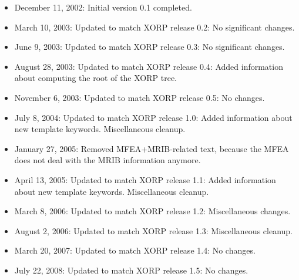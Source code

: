 \documentclass[11pt]{article}
\begin{document}
\begin{itemize}

  \item December 11, 2002: Initial version 0.1 completed.

  \item March 10, 2003: Updated to match XORP release 0.2:
   No significant changes.

  \item June 9, 2003: Updated to match XORP release 0.3:
   No significant changes.

  \item August 28, 2003: Updated to match XORP release 0.4:
   Added information about computing the root of the XORP tree.

  \item November 6, 2003: Updated to match XORP release 0.5:
   No changes.

  \item July 8, 2004: Updated to match XORP release 1.0:
   Added information about new template keywords. Miscellaneous cleanup.

  \item January 27, 2005: Removed MFEA+MRIB-related text, because the MFEA
   does not deal with the MRIB information anymore.

  \item April 13, 2005: Updated to match XORP release 1.1:
   Added information about new template keywords. Miscellaneous cleanup.

  \item March 8, 2006: Updated to match XORP release 1.2:
   Miscellaneous changes.

  \item August 2, 2006: Updated to match XORP release 1.3:
   Miscellaneous cleanup.

  \item March 20, 2007: Updated to match XORP release 1.4:
   No changes.

  \item July 22, 2008: Updated to match XORP release 1.5:
   No changes.

\end{itemize}

%
%

\end{document}
